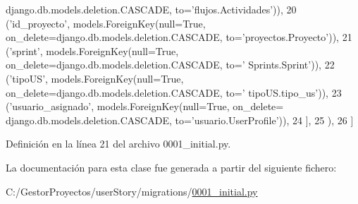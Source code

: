 \begin{DoxyCode}
      django.db.models.deletion.CASCADE, to=\textcolor{stringliteral}{'flujos.Actividades'})),
20                 (\textcolor{stringliteral}{'id\_proyecto'}, models.ForeignKey(null=\textcolor{keyword}{True}, on\_delete=django.db.models.deletion.CASCADE, 
      to=\textcolor{stringliteral}{'proyectos.Proyecto'})),
21                 (\textcolor{stringliteral}{'sprint'}, models.ForeignKey(null=\textcolor{keyword}{True}, on\_delete=django.db.models.deletion.CASCADE, to=\textcolor{stringliteral}{'
      Sprints.Sprint'})),
22                 (\textcolor{stringliteral}{'tipoUS'}, models.ForeignKey(null=\textcolor{keyword}{True}, on\_delete=django.db.models.deletion.CASCADE, to=\textcolor{stringliteral}{'
      tipoUS.tipo\_us'})),
23                 (\textcolor{stringliteral}{'usuario\_asignado'}, models.ForeignKey(null=\textcolor{keyword}{True}, on\_delete=
      django.db.models.deletion.CASCADE, to=\textcolor{stringliteral}{'usuario.UserProfile'})),
24             ],
25         ),
26     ]
\end{DoxyCode}


Definición en la línea 21 del archivo 0001\+\_\+initial.\+py.



La documentación para esta clase fue generada a partir del siguiente fichero\+:\begin{DoxyCompactItemize}
\item 
C\+:/\+Gestor\+Proyectos/user\+Story/migrations/\hyperlink{user_story_2migrations_20001__initial_8py}{0001\+\_\+initial.\+py}\end{DoxyCompactItemize}
